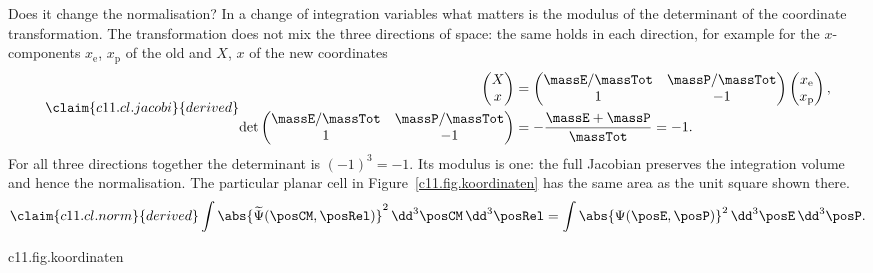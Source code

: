 Does it change the normalisation? In a change of integration variables what matters is
the modulus of the determinant of the coordinate transformation. The transformation does
not mix the three directions of space: the same holds in each direction, for example for
the $x$-components $x_{\mathrm{e}}$, $x_{\mathrm{p}}$ of the old and $X$, $x$ of the new
coordinates
\begin{equation}\label{c11.eq.jacobi}\claim{c11.cl.jacobi}{derived}
  \begin{aligned}
    \begin{pmatrix} X \\ x \end{pmatrix}
    &= \begin{pmatrix} \massE/\massTot & \massP/\massTot \\ 1 & -1 \end{pmatrix}
      \begin{pmatrix} x_{\mathrm{e}} \\ x_{\mathrm{p}} \end{pmatrix}, \\
    \det \begin{pmatrix} \massE/\massTot & \massP/\massTot \\ 1 & -1 \end{pmatrix}
    &= -\frac{\massE + \massP}{\massTot} = -1.
  \end{aligned}
\end{equation}
For all three directions together the determinant is $(-1)^3 = -1$. Its modulus is
one: the full Jacobian preserves the integration volume and hence the normalisation.
The particular planar cell in Figure~\ref{c11.fig.koordinaten} has the same area as
the unit square shown there.
\begin{equation}\label{c11.eq.norm}\claim{c11.cl.norm}{derived}
  \int \abs{\widetilde{\Psi}(\posCM, \posRel)}^2 \,\dd^3\posCM\,\dd^3\posRel
  = \int \abs{\Psi(\posE, \posP)}^2 \,\dd^3\posE\,\dd^3\posP .
\end{equation}

\begin{tpcfigure}{c11.fig.koordinaten}
  \caption{The change of coordinates for one direction of space, again drawn for
    $\massP : \massE = 3 : 1$. Solid lines: $X$ fixed; dashed lines: $x$ fixed. The new
    coordinate lines are not perpendicular to each other, but the mesh between $X = 1$,
    $X = 2$, $x = 0$ and $x = 1$ has the same area as the unit square of the old
    coordinates: the modulus of the determinant in \eqref{c11.eq.jacobi} is one.}
\end{tpcfigure}

